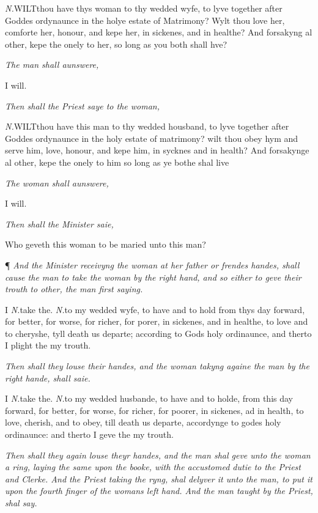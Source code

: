 \emph{N.}WILT\textbf{}thou have thys woman to thy wedded wyfe, to lyve together after Goddes
ordynaunce in the holye estate of Matrimony? Wylt thou love her, comforte
her, honour, and kepe her, in sickenes, and in healthe? And forsakyng
al other, kepe the onely to her, so long as you both shall hve?

\emph{The
man shall aunswere,}

I
will.

\emph{Then
shall the Priest saye to the woman,}

\emph{N.}WILT\textbf{}thou have this man to thy wedded housband, to lyve together after
Goddes ordynaunce in the holy estate of matrimony? wilt thou obey hym
and serve him, love, honour, and kepe him, in sycknes and in health? And
forsakynge al other, kepe the onely to him so long as ye bothe shal live

\emph{The
woman shall aunswere,}

I
will.

\emph{Then
shall the Minister saie,}

Who
geveth this woman to be maried unto this man?

¶
\emph{And the Minister receivyng the woman at her father or frendes handes,
shall cause the man to take the woman by the right hand, and so either
to geve their trouth to other, the man first saying.}

I
\emph{N.}take the. \emph{N.}to my wedded wyfe, to have and to hold from
thys day forward, for better, for worse, for richer, for porer, in sickenes,
and in healthe, to love and to cheryshe, tyll death us departe; according
to Gods holy ordinaunce, and therto I plight the my trouth.

\emph{Then
shall they louse their handes, and the woman takyng againe the man by
the right hande, shall saie.}

I
\emph{N.}take the. \emph{N.}to my wedded husbande, to have and to holde,
from this day forward, for better, for worse, for richer, for poorer,
in sickenes, ad in health, to love, cherish, and to obey, till death us
departe, accordynge to godes holy ordinaunce: and therto I geve the my
trouth.

\emph{Then
shall they again louse theyr handes, and the man shal geve unto the woman
a ring, laying the same upon the booke, with the accustomed dutie to the
Priest and Clerke. And the Priest taking the ryng, shal delyver it unto
the man, to put it upon the fourth finger of the womans left hand. And
the man taught by the Priest, shal say.}


